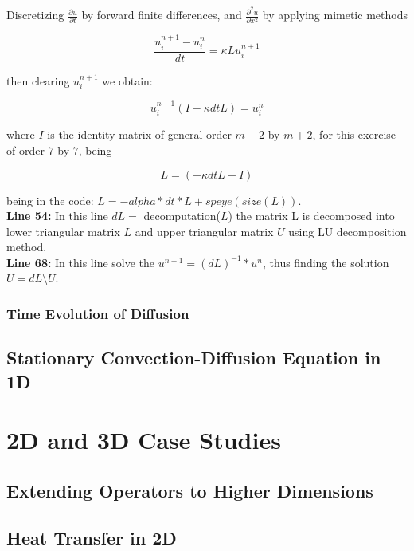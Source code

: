 Discretizing $\frac{\partial u}{\partial t}$ by forward finite differences, and $\frac{\partial^{2} u}{\partial x^{2}}$ by applying mimetic methods

\begin{equation}
	\frac{u^{n+1}_{i} - u^{n}_{i} }{dt} = \kappa L 	u^{n+1}_{i}
\end{equation}

then clearing $u^{n+1}_{i}$ we obtain:


\begin{equation}
	u^{n+1}_{i}(I - \kappa dt L ) = u^{n}_{i}
\end{equation}

where $I$ is the identity matrix of general order $m+2$ by $m+2$, for this exercise of order $7$ by $7$, being

$$  L = (-\kappa dt L + I)$$

being in the code: $ L = -alpha*dt*L +speye(size(L))$.\\

\textbf{Line 54:} In this line $dL=$ decomputation($L$) the matrix L is decomposed into lower triangular matrix $L$ and upper triangular matrix $U$ using LU decomposition method.\\

\textbf{Line 68:} In this line solve the $u^{n+1} =(dL)^{-1}*u^{n}$, thus finding the solution $U=dL \setminus U$.\\

\subsection{Time Evolution of Diffusion}

\section{Stationary Convection-Diffusion Equation in 1D}

\chapter{2D and 3D Case Studies}

\section{Extending Operators to Higher Dimensions}

\section{Heat Transfer in 2D}

